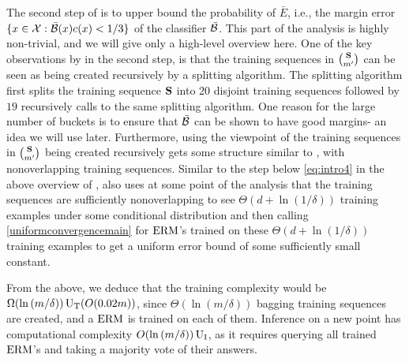 The second step of \citeauthor{baggingoptimalPAClearner} is to upper bound the probability of $\bar{E}$, i.e., the margin error $\{ x\in \mathcal{X}: \bar{\mathcal{B}}(x)c(x)< 1/3\}$ of the classifier $\bar{\mathcal{B}}$. This part of the analysis is highly non-trivial, and we will give only a high-level overview here. One of the key observations by \citeauthor{baggingoptimalPAClearner} in the second step, is that the training sequences in $ \binom{\mathbf{S}}{m'} $ can be seen as being created recursively by a splitting algorithm. The splitting algorithm first splits the training sequence $\mathbf{S}$ into $20$ disjoint training sequences followed by $19$ recursively calls to the same splitting algorithm. 
One reason for the large number of buckets is to ensure that $\bar{\mathcal{B}}$ can be shown to have good margins- an idea we will use later. Furthermore, using the viewpoint of the training sequences in $ \binom{\mathbf{S}}{m'} $ being created recursively \citeauthor{baggingoptimalPAClearner} gets some structure similar to \cite{hanneke2016refined}, with nonoverlapping training sequences. Similar to the step below \cref{eq:intro4} in the above overview of \cite{hannekeoptimal}, \citeauthor{baggingoptimalPAClearner} also uses at some point of the analysis that the training sequences are sufficiently nonoverlapping to see $\Theta(d+\ln{\left(1/\delta \right)})$ training examples under some conditional distribution and then calling \cref{uniformconvergencemain} for $\mathrm{ERM}$'s trained on these $\Theta(d+\ln{\left(1/\delta \right)})$ training examples to get a uniform error bound of some sufficiently small constant. 

From the above, we deduce that the training complexity would be $\Omega(\ln{\left(m/\delta \right)})\operatorname{U_{T}}(O(0.02m))$, since $\Theta(\ln{\left(m/\delta \right)})$ bagging training sequences are created, and a $\mathrm{ERM}$ is trained on each of them. Inference on a new point has computational complexity $O(\ln{\left(m/\delta \right)})\operatorname{U_{I}}$, as it requires querying all trained $ \mathrm{ERM} $'s and taking a majority vote of their answers.

